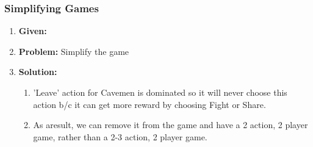 \subsubsection{Simplifying Games}
\begin{example}
    \begin{enumerate}
        \item \textbf{Given:} 
        \item \textbf{Problem:} Simplify the game 
        \item \textbf{Solution:}
        \begin{enumerate}
            \item 'Leave' action for Cavemen is dominated so it will never choose this action b/c it can get more reward by choosing Fight or Share. 
            \item As aresult, we can remove it from the game and have a 2 action, 2 player game, rather than a 2-3 action, 2 player game.
        \end{enumerate}
    \end{enumerate}
\end{example}

